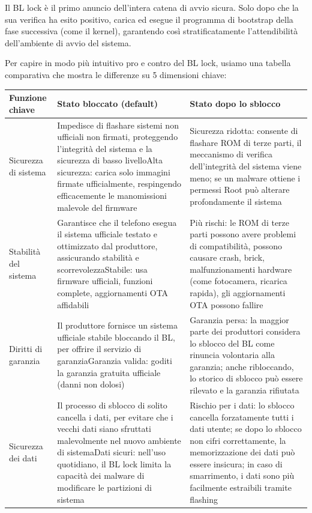 
Il BL lock è il primo anuncio dell'intera catena di avvio sicura. Solo dopo che la sua verifica ha esito positivo, carica ed esegue il programma di bootstrap della fase successiva (come il kernel), garantendo così stratificatamente l'attendibilità dell'ambiente di avvio del sistema.


Per capire in modo più intuitivo pro e contro del BL lock, usiamo una tabella comparativa che mostra le differenze su 5 dimensioni chiave:

\begin{center}
\begin{tabularx}{\linewidth}{|X|X|X|}
\hline
\textbf{Funzione chiave} & \textbf{Stato bloccato (default)} & \textbf{Stato dopo lo sblocco} \tabularnewline
\hline
Sicurezza di sistema & Impedisce di flashare sistemi non ufficiali non firmati, proteggendo l'integrità del sistema e la sicurezza di basso livello\newline Alta sicurezza: carica solo immagini firmate ufficialmente, respingendo efficacemente le manomissioni malevole del firmware & Sicurezza ridotta: consente di flashare ROM di terze parti, il meccanismo di verifica dell'integrità del sistema viene meno; se un malware ottiene i permessi Root può alterare profondamente il sistema \tabularnewline
Stabilità del sistema & Garantisce che il telefono esegua il sistema ufficiale testato e ottimizzato dal produttore, assicurando stabilità e scorrevolezza\newline Stabile: usa firmware ufficiali, funzioni complete, aggiornamenti OTA affidabili & Più rischi: le ROM di terze parti possono avere problemi di compatibilità, possono causare crash, brick, malfunzionamenti hardware (come fotocamera, ricarica rapida), gli aggiornamenti OTA possono fallire \tabularnewline
Diritti di garanzia & Il produttore fornisce un sistema ufficiale stabile bloccando il BL, per offrire il servizio di garanzia\newline Garanzia valida: goditi la garanzia gratuita ufficiale (danni non dolosi) & Garanzia persa: la maggior parte dei produttori considera lo sblocco del BL come rinuncia volontaria alla garanzia; anche ribloccando, lo storico di sblocco può essere rilevato e la garanzia rifiutata \tabularnewline
Sicurezza dei dati & Il processo di sblocco di solito cancella i dati, per evitare che i vecchi dati siano sfruttati malevolmente nel nuovo ambiente di sistema\newline Dati sicuri: nell'uso quotidiano, il BL lock limita la capacità dei malware di modificare le partizioni di sistema & Rischio per i dati: lo sblocco cancella forzatamente tutti i dati utente; se dopo lo sblocco non cifri correttamente, la memorizzazione dei dati può essere insicura; in caso di smarrimento, i dati sono più facilmente estraibili tramite flashing \tabularnewline

\end{tabularx}
\end{center}
